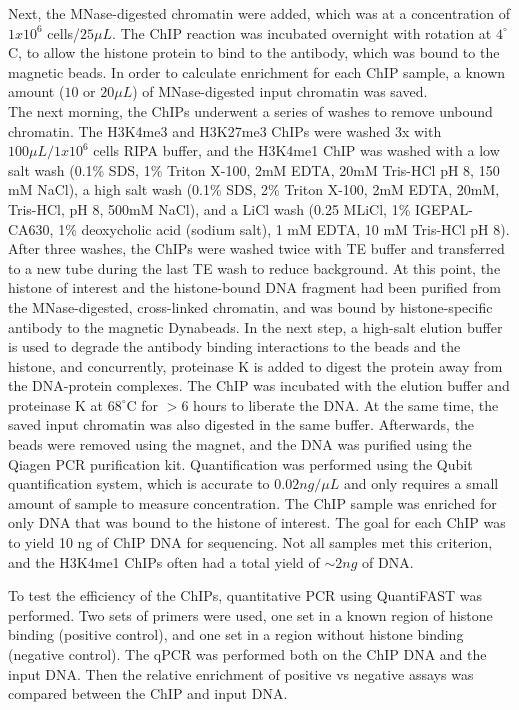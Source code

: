\documentclass[10pt,letterpaper]{article}
\begin{document}
Next, the MNase-digested chromatin were added, which was at a
concentration of \(1x10^6\) cells/\(25\mu L\). The ChIP reaction was
incubated overnight with rotation at \(4^\circ\)C, to allow the histone
protein to bind to the antibody, which was bound to the magnetic beads.
In order to calculate enrichment for each ChIP sample, a known amount
(\(10\) or \(20\mu L\)) of MNase-digested input chromatin was saved.\\
The next morning, the ChIPs underwent a series of washes to remove
unbound chromatin. The H3K4me3 and H3K27me3 ChIPs were washed 3x with
\(100\mu L/1x10^6\) cells RIPA buffer, and the H3K4me1 ChIP was washed
with a low salt wash (0.1\% SDS, 1\% Triton X-100, 2mM EDTA, 20mM
Tris-HCl pH 8, 150 mM NaCl), a high salt wash (0.1\% SDS, 2\% Triton
X-100, 2mM EDTA, 20mM, Tris-HCl, pH 8, 500mM NaCl), and a LiCl wash
(0.25 MLiCl, 1\% IGEPAL-CA630, 1\% deoxycholic acid (sodium salt), 1 mM
EDTA, 10 mM Tris-HCl pH 8). After three washes, the ChIPs were washed
twice with TE buffer and transferred to a new tube during the last TE
wash to reduce background. At this point, the histone of interest and
the histone-bound DNA fragment had been purified from the
MNase-digested, cross-linked chromatin, and was bound by
histone-specific antibody to the magnetic Dynabeads. In the next step, a
high-salt elution buffer is used to degrade the antibody binding
interactions to the beads and the histone, and concurrently, proteinase
K is added to digest the protein away from the DNA-protein complexes.
The ChIP was incubated with the elution buffer and proteinase K at
\(68^\circ\)C for \(>6\) hours to liberate the DNA. At the same time,
the saved input chromatin was also digested in the same buffer.
Afterwards, the beads were removed using the magnet, and the DNA was
purified using the Qiagen PCR purification kit. Quantification was
performed using the Qubit quantification system, which is accurate to
\(0.02 ng/\mu L\) and only requires a small amount of sample to measure
concentration. The ChIP sample was enriched for only DNA that was bound
to the histone of interest. The goal for each ChIP was to yield 10 ng of
ChIP DNA for sequencing. Not all samples met this criterion, and the
H3K4me1 ChIPs often had a total yield of \(\sim 2 ng\) of DNA.

To test the efficiency of the ChIPs, quantitative PCR using QuantiFAST
was performed. Two sets of primers were used, one set in a known region
of histone binding (positive control), and one set in a region without
histone binding (negative control). The qPCR was performed both on the
ChIP DNA and the input DNA. Then the relative enrichment of positive vs
negative assays was compared between the ChIP and input DNA.
\end{document}
